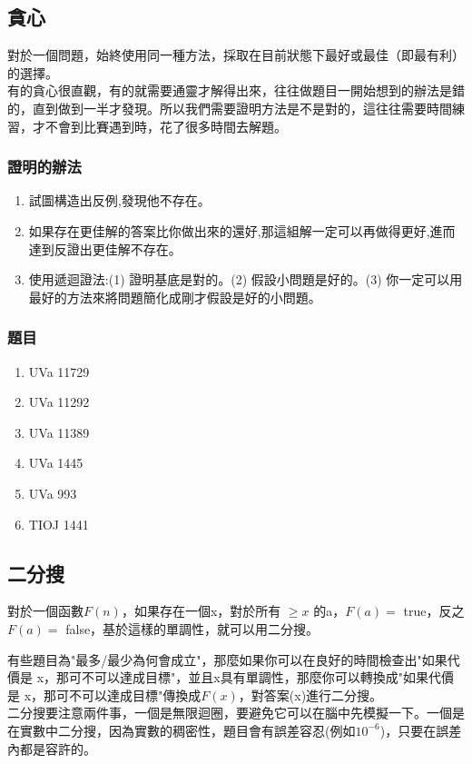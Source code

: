 \subsection{貪心}
對於一個問題，始終使用同一種方法，採取在目前狀態下最好或最佳（即最有利）的選擇。\\
有的貪心很直觀，有的就需要通靈才解得出來，往往做題目一開始想到的辦法是錯的，直到做到一半才發現。所以我們需要證明方法是不是對的，這往往需要時間練習，才不會到比賽遇到時，花了很多時間去解題。\\
\subsubsection{證明的辦法}
\begin{enumerate}
\item 試圖構造出反例,發現他不存在。
\item 如果存在更佳解的答案比你做出來的還好,那這組解一定可以再做得更好,進而達到反證出更佳解不存在。
\item 使用遞迴證法:(1) 證明基底是對的。(2) 假設小問題是好的。(3) 你一定可以用最好的方法來將問題簡化成剛才假設是好的小問題。
\end{enumerate}
\subsubsection{題目}
\begin{enumerate}
\item UVa 11729
\item UVa 11292
\item UVa 11389
\item UVa 1445
\item UVa 993
\item TIOJ 1441
\end{enumerate}
\subsection{二分搜}
對於一個函數$F(n)$，如果存在一個x，對於所有 $\geq x$ 的a，$F(a)=$ true，反之$F(a)=$ false，基於這樣的單調性，就可以用二分搜。

有些題目為"最多/最少為何會成立"，那麼如果你可以在良好的時間檢查出"如果代價是 x，那可不可以達成目標"，並且x具有單調性，那麼你可以轉換成"如果代價是 x，那可不可以達成目標"傳換成$F(x)$，對答案(x)進行二分搜。\\
二分搜要注意兩件事，一個是無限迴圈，要避免它可以在腦中先模擬一下。一個是在實數中二分搜，因為實數的稠密性，題目會有誤差容忍(例如$10^{-6}$)，只要在誤差內都是容許的。

